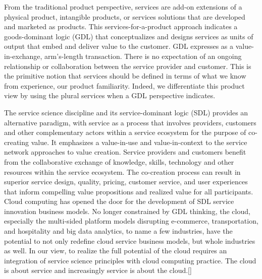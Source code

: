 From the traditional product perspective, services are add-on extensions of a physical product, intangible products, or services solutions that are developed and marketed as products. This services-for-a-product approach indicates a goods-dominant logic (GDL) that conceptualizes and designs services as units of output that embed and deliver value to the customer. GDL expresses as a value-in-exchange, arm's-length transaction. There is no expectation of an ongoing relationship or collaboration between the service provider and customer. This is the primitive notion that services should be defined in terms of what we know from experience, our product familiarity. Indeed, we differentiate this product view by using the plural services when a GDL perspective indicates.
\newline

The service science discipline and its service-dominant logic (SDL) provides an alternative paradigm, with service as a process that involves providers, customers and other complementary actors within a service ecosystem for the purpose of co-creating value. It emphasizes a value-in-use and value-in-context to the service network approaches to value creation. Service providers and customers benefit from the collaborative exchange of knowledge, skills, technology and other resources within the service ecosystem. The co-creation process can result in superior service design, quality, pricing, customer service, and user experiences that inform compelling value propositions and realized value for all participants. Cloud computing has opened the door for the development of SDL service innovation business models. No longer constrained by GDL thinking, the cloud, especially the multi-sided platform models disrupting e-commerce, transportation, and hospitality and big data analytics, to name a few industries, have the potential to not only redefine cloud service business models, but whole industries as well. In our view, to realize the full potential of the cloud requires an integration of service science principles with cloud computing practice. The cloud is about service and increasingly service is about the cloud.[\cite{24}]
\newline

